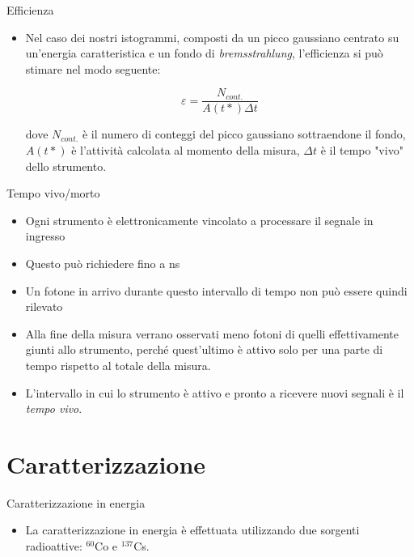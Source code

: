 \documentclass [xcolor=svgnames] {beamer}
\begin{document}
\begin{frame}{Efficienza}
	\begin{itemize}
		\item Nel caso dei nostri istogrammi, composti da un picco gaussiano centrato su un'energia caratteristica e un fondo di \emph{bremsstrahlung}, l'efficienza si può stimare nel modo seguente:
		
		\begin{equation}
			\varepsilon = \dfrac{N_{cont.}}{A(t*) \Delta t}
		\end{equation}
	
		dove $N_{cont.}$ è il numero di conteggi del picco gaussiano sottraendone il fondo, $A(t*)$ è l'attività calcolata al momento della misura, $\Delta t$ è il tempo "vivo" dello strumento.
	\end{itemize}
\end{frame}

\begin{frame}{Tempo vivo/morto}
	\begin{itemize}
		\item Ogni strumento è elettronicamente vincolato a processare il segnale in ingresso
		\item Questo può richiedere fino a ns
		\item Un fotone in arrivo durante questo intervallo di tempo non può essere quindi rilevato
		\item Alla fine della misura verrano osservati meno fotoni di quelli effettivamente giunti allo strumento, perché quest'ultimo è attivo solo per una parte di tempo rispetto al totale della misura.
		\item L'intervallo in cui lo strumento è attivo e pronto a ricevere nuovi segnali è il \emph{tempo vivo}.
	\end{itemize}
\end{frame}

\section{Caratterizzazione}
\begin{frame}{Caratterizzazione in energia}
	\begin{itemize}
		\item La caratterizzazione in energia è effettuata utilizzando due sorgenti radioattive: $^{60}$Co e $^{137}$Cs.
	\end{itemize}
\end{frame}
\end{document}
